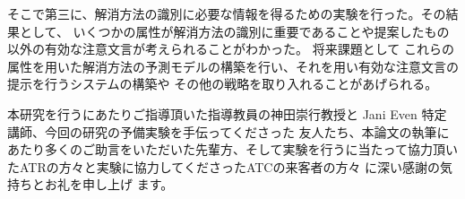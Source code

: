 \documentclass{kuisthesis}
\begin{document}
そこで第三に、解消方法の識別に必要な情報を得るための実験を行った。その結果として、
いくつかの属性が解消方法の識別に重要であることや提案したもの以外の有効な注意文言が考えられることがわかった。
将来課題として
これらの属性を用いた解消方法の予測モデルの構築を行い、それを用い有効な注意文言の提示を行うシステムの構築や
その他の戦略を取り入れることがあげられる。

\acknowledgments %
本研究を行うにあたりご指導頂いた指導教員の神田崇行教授と Jani Even
特定講師、今回の研究の予備実験を手伝ってくださった
友人たち、本論文の執筆にあたり多くのご助言をいただいた先輩方、そして実験を行うに当たって協力頂いたATRの方々と実験に協力してくださったATCの来客者の方々
に深い感謝の気持ちとお礼を申し上げ
ます。

\nocite{*}
\end{document}
